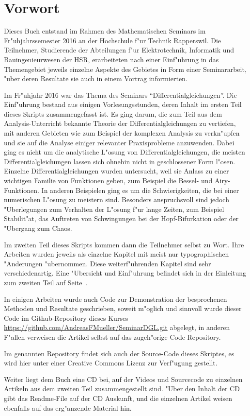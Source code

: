 %
%
%
\chapter*{Vorwort}
\rhead{}
Dieses Buch entstand im Rahmen des Mathematischen Seminars
im Fr"uhjahrssemester 2016 an der Hochschule f"ur Technik Rapperswil.
Die Teilnehmer, Studierende der Abteilungen f"ur Elektrotechnik,
Informatik und Bauingenieurwesen der
HSR, erarbeiteten nach einer Einf"uhrung in das Themengebiet jeweils
einzelne Aspekte des Gebietes in Form einer Seminararbeit, "uber
deren Resultate sie auch in einem Vortrag informierten. 

Im Fr"uhjahr 2016 war das Thema des Seminars ``Differentialgleichungen''.
Die Einf"uhrung bestand aus einigen Vorlesungsstunden, deren
Inhalt im ersten Teil dieses Skripts zusammengefasst ist.
Es ging darum, die zum Teil aus dem Analysis-Unterricht bekannte
Theorie der Differentialgleichungen zu vertiefen, mit anderen Gebieten
wie zum Beispiel der komplexen Analysis zu verkn"upfen und sie
auf die Analyse einiger relevanter Praxisprobleme anzuwenden.
Dabei ging es nicht um die analytische L"osung von Differentialgleichungen,
die meisten Differentialgleichungen lassen sich ohnehin nicht in
geschlossener Form l"osen.
Einzelne Differentialgleichungen wurden untersucht, weil sie Anlass
zu einer wichtigen Familie von Funktionen geben, zum Beispiel die
Bessel- und Airy-Funktionen.
In anderen Beispielen ging es um die Schwierigkeiten, die bei einer
numerischen L"osung zu meistern sind.
Besonders anspruchsvoll sind jedoch "Uberlegungen zum Verhalten der
L"osung f"ur lange Zeiten, zum Beispiel Stabilit"at, das Auftreten
von Schwingungen bei der Hopf-Bifurkation oder der "Ubergang zum
Chaos.

Im zweiten Teil dieses Skripts kommen dann die Teilnehmer selbst zu Wort.
Ihre Arbeiten wurden jeweils als einzelne
Kapitel mit meist nur typographischen "Anderungen "ubernommen.
Diese weiterf"uhrenden Kapitel sind sehr verschiedenartig.
Eine "Ubersicht und Einf"uhrung befindet sich in der Einleitung
zum zweiten Teil auf Seite~\pageref{skript:uebersicht}.

In einigen Arbeiten wurde auch Code zur Demonstration der 
besprochenen Methoden und Resultate geschrieben, soweit
m"oglich und sinnvoll wurde dieser Code im Github-Repository
dieses Kurses \url{https://github.com/AndreasFMueller/SeminarDGL.git}
abgelegt, in anderen F"allen verweisen die Artikel selbst auf
das zugeh"orige Code-Repository.

Im genannten Repository findet sich auch der Source-Code dieses
Skriptes, es wird hier unter einer Creative Commons Lizenz
zur Verf"ugung gestellt.

Weiter liegt dem Buch eine CD bei, auf der Videos und Sourcecode zu
einzelnen Artikeln aus dem zweiten Teil zusammengestellt sind.
"Uber den Inhalt der CD gibt das Readme-File auf der CD Auskunft,
und die einzelnen Artikel weisen ebenfalls auf das erg"anzende
Material hin.


